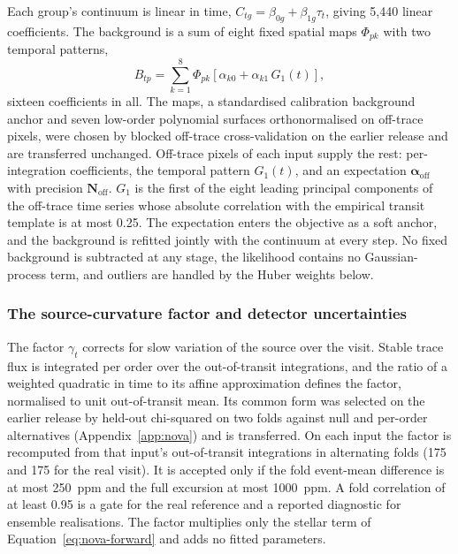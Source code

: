 Each group's continuum is linear in time,
$C_{tg}=\beta_{0g}+\beta_{1g}\tau_t$, giving 5{,}440 linear coefficients.
The background is a sum of eight fixed spatial maps $\Phi_{pk}$ with two
temporal patterns,
\begin{equation}
 B_{tp}=\sum_{k=1}^{8}\Phi_{pk}
 \left[\alpha_{k0}+\alpha_{k1}\,G_1(t)\right],
 \label{eq:background-model}
\end{equation}
sixteen coefficients in all. The maps, a standardised calibration
background anchor and seven low-order polynomial surfaces orthonormalised
on off-trace pixels, were chosen by blocked off-trace cross-validation
on the earlier release and are transferred unchanged. Off-trace pixels
of each input supply the rest: per-integration coefficients, the
temporal pattern $G_1(t)$, and an expectation
$\bm{\alpha}_{\mathrm{off}}$ with precision $\bm{N}_{\mathrm{off}}$.
$G_1$ is the first of the eight leading principal components of the
off-trace time series whose absolute correlation with the empirical
transit template is at most 0.25. The
expectation enters the objective as a soft anchor, and the background is
refitted jointly with the continuum at every step. No fixed background is subtracted at any stage, the likelihood
contains no Gaussian-process term, and outliers are handled by the Huber
weights below.

\subsubsection{The source-curvature factor and detector uncertainties}


The factor $\gamma_t$ corrects for slow variation of the source over the
visit. Stable trace flux is integrated per order over the out-of-transit
integrations, and the ratio of a weighted quadratic in time to its affine
approximation defines the factor, normalised to unit out-of-transit mean.
Its common form was selected on the earlier release by held-out
chi-squared on two folds against null and per-order alternatives
(Appendix~\ref{app:nova}) and is transferred. On each input the factor is
recomputed from that input's out-of-transit integrations in alternating
folds (175 and 175 for the real visit). It is accepted only if the fold
event-mean difference is at most 250~ppm and the full excursion at most
1000~ppm. A fold correlation of at least 0.95 is a gate for the real
reference and a reported diagnostic for ensemble realisations. The
factor multiplies only the stellar term of Equation~\ref{eq:nova-forward}
and adds no fitted parameters.


